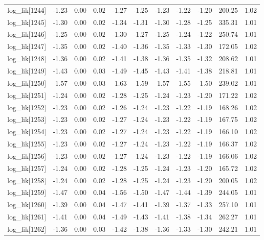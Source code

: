 \begin{table}[ht]
\begin{tabular}{rrrrrrrrrrr}
  log\_lik[1244] & -1.23 & 0.00 & 0.02 & -1.27 & -1.25 & -1.23 & -1.22 & -1.20 & 200.25 & 1.02 \\ 
  log\_lik[1245] & -1.30 & 0.00 & 0.02 & -1.34 & -1.31 & -1.30 & -1.28 & -1.25 & 335.31 & 1.01 \\ 
  log\_lik[1246] & -1.25 & 0.00 & 0.02 & -1.30 & -1.27 & -1.25 & -1.24 & -1.22 & 250.74 & 1.01 \\ 
  log\_lik[1247] & -1.35 & 0.00 & 0.02 & -1.40 & -1.36 & -1.35 & -1.33 & -1.30 & 172.05 & 1.02 \\ 
  log\_lik[1248] & -1.36 & 0.00 & 0.02 & -1.41 & -1.38 & -1.36 & -1.35 & -1.32 & 208.62 & 1.01 \\ 
  log\_lik[1249] & -1.43 & 0.00 & 0.03 & -1.49 & -1.45 & -1.43 & -1.41 & -1.38 & 218.81 & 1.01 \\ 
  log\_lik[1250] & -1.57 & 0.00 & 0.03 & -1.63 & -1.59 & -1.57 & -1.55 & -1.50 & 239.02 & 1.01 \\ 
  log\_lik[1251] & -1.24 & 0.00 & 0.02 & -1.28 & -1.25 & -1.24 & -1.23 & -1.20 & 171.22 & 1.02 \\ 
  log\_lik[1252] & -1.23 & 0.00 & 0.02 & -1.26 & -1.24 & -1.23 & -1.22 & -1.19 & 168.26 & 1.02 \\ 
  log\_lik[1253] & -1.23 & 0.00 & 0.02 & -1.27 & -1.24 & -1.23 & -1.22 & -1.19 & 167.75 & 1.02 \\ 
  log\_lik[1254] & -1.23 & 0.00 & 0.02 & -1.27 & -1.24 & -1.23 & -1.22 & -1.19 & 166.10 & 1.02 \\ 
  log\_lik[1255] & -1.23 & 0.00 & 0.02 & -1.27 & -1.24 & -1.23 & -1.22 & -1.19 & 166.37 & 1.02 \\ 
  log\_lik[1256] & -1.23 & 0.00 & 0.02 & -1.27 & -1.24 & -1.23 & -1.22 & -1.19 & 166.06 & 1.02 \\ 
  log\_lik[1257] & -1.24 & 0.00 & 0.02 & -1.28 & -1.25 & -1.24 & -1.23 & -1.20 & 165.72 & 1.02 \\ 
  log\_lik[1258] & -1.24 & 0.00 & 0.02 & -1.28 & -1.25 & -1.24 & -1.23 & -1.20 & 200.05 & 1.02 \\ 
  log\_lik[1259] & -1.47 & 0.00 & 0.04 & -1.56 & -1.50 & -1.47 & -1.44 & -1.39 & 244.05 & 1.01 \\ 
  log\_lik[1260] & -1.39 & 0.00 & 0.04 & -1.47 & -1.41 & -1.39 & -1.37 & -1.33 & 257.10 & 1.01 \\ 
  log\_lik[1261] & -1.41 & 0.00 & 0.04 & -1.49 & -1.43 & -1.41 & -1.38 & -1.34 & 262.27 & 1.01 \\ 
  log\_lik[1262] & -1.36 & 0.00 & 0.03 & -1.42 & -1.38 & -1.36 & -1.33 & -1.30 & 242.21 & 1.01 \\ 

\end{tabular}
\end{table}
